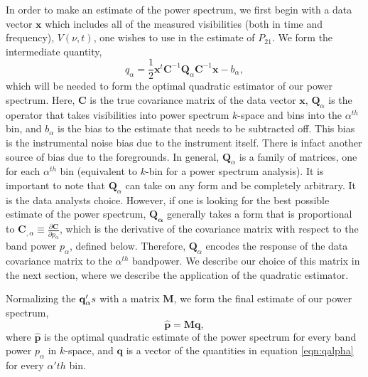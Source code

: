 \documentclass[twocolumn,numberedappendix]{emulateapj} \shorttitle{PSA64}
\newcommand{\x}{\mathbf{x}} \newcommand{\xhat}{\hat{\mathbf{x}}}
\begin{document}
In order to make an estimate of the power spectrum, we first begin with a data
vector $\x$ which includes all of the measured  visibilities (both in time and
frequency), $V(\nu,t)$, one wishes to use in the estimate of $P_{21}$. We form
the intermediate quantity,
\begin{equation}
\label{eqn:qalpha}
    q_{\alpha} = \frac{1}{2}\x^{t}\mathbf{C}^{-1}\mathbf{Q}_{\alpha}\mathbf{C}^{-1}\x - b_{\alpha},
\end{equation}
which will be needed to form the optimal quadratic estimator of our power spectrum.
Here, $\mathbf{C}$ is the true covariance matrix of the data vector $\x$, 
$\mathbf{Q}_{\alpha}$ is the operator that takes visibilities into power spectrum
$k$-space and bins into the ${\alpha}^{th}$ bin, and $b_{\alpha}$ is the bias to
the estimate that needs to be subtracted off. This bias is the instrumental
noise bias due to the instrument itself. There is infact another source of bias
due to the foregrounds. In general, $\mathbf{Q}_{\alpha}$
is a family of matrices, one for each $\alpha^{th}$ bin (equivalent to $k$-bin
for a power spectrum analysis). It is important to note that
$\mathbf{Q}_{\alpha}$ can take on any form and be completely arbitrary. It is
the data analysts choice. However, if one is looking for the best possible
estimate of the power spectrum,  $\mathbf{Q_{\alpha}}$ generally
takes a form that is proportional to  $\mathbf{C}_{,\alpha} \equiv
\frac{\partial{\mathbf{C}}}{\partial p_{\alpha}}$, which is the derivative of
the covariance matrix with respect to the band power $p_{\alpha}$, defined
below.  Therefore, $\mathbf{Q}_{\alpha}$ encodes the response of the data
covariance matrix to the $\alpha^{th}$ bandpower. We describe our choice of this
matrix in the next section, where we describe the application of the quadratic
estimator. 

Normalizing the $\mathbf{q}_{\alpha}'s$ with a matrix $\mathbf{M}$, we form
the final estimate of our power spectrum,
\begin{equation}\label{eqn:pspec_norm}
    \mathbf{\hat{p}} = \mathbf{M}\mathbf{q},
\end{equation}
where $\mathbf{\hat{p}}$ is the optimal quadratic estimate of the power spectrum
for every band power $p_{\alpha}$ in $k$-space, and $\mathbf{q}$ is a vector of the
quantities in equation \ref{eqn:qalpha} for every $\alpha'th$ bin.
\end{document}
